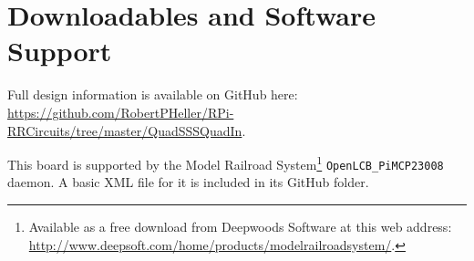 \section{Downloadables and Software Support}

Full design information is available on GitHub here:
\url{https://github.com/RobertPHeller/RPi-RRCircuits/tree/master/QuadSSSQuadIn}.

This board is supported by the Model Railroad System\footnote{Available as a 
free download from Deepwoods Software at this web address: 
\url{http://www.deepsoft.com/home/products/modelrailroadsystem/}.}
\texttt{OpenLCB\_PiMCP23008} daemon. A basic XML file for it is included in 
its GitHub folder. 

